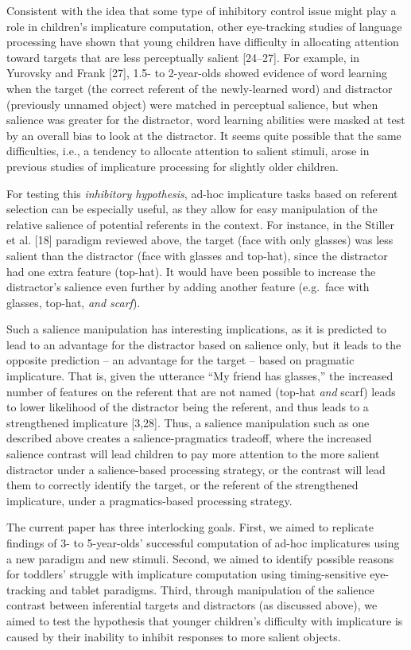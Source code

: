 \documentclass{rsos}
\begin{document}
Consistent with the idea that some type of inhibitory control issue
might play a role in children's implicature computation, other
eye-tracking studies of language processing have shown that young
children have difficulty in allocating attention toward targets that are
less perceptually salient {[}24--27{]}. For example, in Yurovsky and Frank {[}27{]}, 1.5-
to 2-year-olds showed evidence of word learning when the target (the
correct referent of the newly-learned word) and distractor (previously
unnamed object) were matched in perceptual salience, but when salience
was greater for the distractor, word learning abilities were masked at
test by an overall bias to look at the distractor. It seems quite
possible that the same difficulties, i.e., a tendency to allocate
attention to salient stimuli, arose in previous studies of implicature
processing for slightly older children.

For testing this \emph{inhibitory hypothesis}, ad-hoc implicature tasks
based on referent selection can be especially useful, as they allow for
easy manipulation of the relative salience of potential referents in the
context. For instance, in the Stiller et al. {[}18{]} paradigm reviewed above, the
target (face with only glasses) was less salient than the distractor
(face with glasses and top-hat), since the distractor had one extra
feature (top-hat). It would have been possible to increase the
distractor's salience even further by adding another feature (e.g.~face
with glasses, top-hat, \emph{and scarf}).

Such a salience manipulation has interesting implications, as it is
predicted to lead to an advantage for the distractor based on salience
only, but it leads to the opposite prediction -- an advantage for the
target -- based on pragmatic implicature. That is, given the utterance
``My friend has glasses,'' the increased number of features on the
referent that are not named (top-hat \emph{and} scarf) leads to lower
likelihood of the distractor being the referent, and thus leads to a
strengthened implicature {[}3,28{]}. Thus, a salience manipulation such
as one described above creates a salience-pragmatics tradeoff, where the
increased salience contrast will lead children to pay more attention to
the more salient distractor under a salience-based processing strategy,
or the contrast will lead them to correctly identify the target, or the
referent of the strengthened implicature, under a pragmatics-based
processing strategy.

The current paper has three interlocking goals. First, we aimed to
replicate findings of 3- to 5-year-olds' successful computation of
ad-hoc implicatures using a new paradigm and new stimuli. Second, we
aimed to identify possible reasons for toddlers' struggle with
implicature computation using timing-sensitive eye-tracking and tablet
paradigms. Third, through manipulation of the salience contrast between
inferential targets and distractors (as discussed above), we aimed to
test the hypothesis that younger children's difficulty with implicature
is caused by their inability to inhibit responses to more salient
objects.
\end{document}
